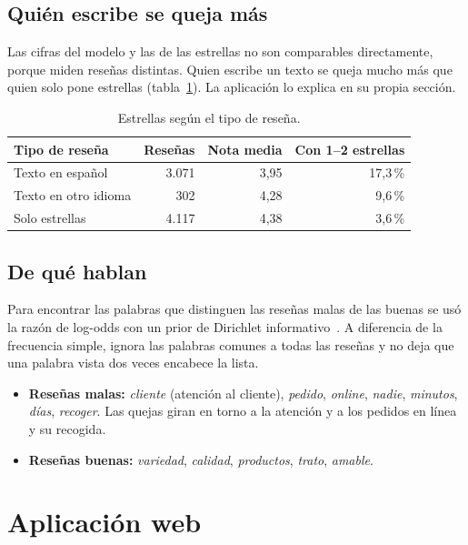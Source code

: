 \documentclass[11pt,a4paper]{article}
\newcommand{\pct}[1]{#1\,\%}
\begin{document}
\subsection{Quién escribe se queja más}

Las cifras del modelo y las de las estrellas no son comparables directamente, porque miden reseñas distintas. Quien
escribe un texto se queja mucho más que quien solo pone estrellas (tabla~\ref{tab:quien}). La aplicación lo explica
en su propia sección.

\begin{table}[htbp]
\centering\small
\caption{Estrellas según el tipo de reseña.}
\label{tab:quien}
\begin{tabular}{@{}lrrr@{}}
\toprule
Tipo de reseña & Reseñas & Nota media & Con 1--2 estrellas \\
\midrule
Texto en español     & 3.071 & 3,95 & \pct{17,3} \\
Texto en otro idioma & 302   & 4,28 & \pct{9,6} \\
Solo estrellas       & 4.117 & 4,38 & \pct{3,6} \\
\bottomrule
\end{tabular}
\end{table}

\subsection{De qué hablan}

Para encontrar las palabras que distinguen las reseñas malas de las buenas se usó la razón de log-odds con un prior
de Dirichlet informativo~\cite{monroe2008}. A diferencia de la frecuencia simple, ignora las palabras comunes a todas
las reseñas y no deja que una palabra vista dos veces encabece la lista.

\begin{itemize}
  \item \textbf{Reseñas malas:} \emph{cliente} (atención al cliente), \emph{pedido}, \emph{online}, \emph{nadie},
        \emph{minutos}, \emph{días}, \emph{recoger}. Las quejas giran en torno a la atención y a los pedidos en línea
        y su recogida.
  \item \textbf{Reseñas buenas:} \emph{variedad}, \emph{calidad}, \emph{productos}, \emph{trato}, \emph{amable}.
\end{itemize}

\section{Aplicación web}
\end{document}
